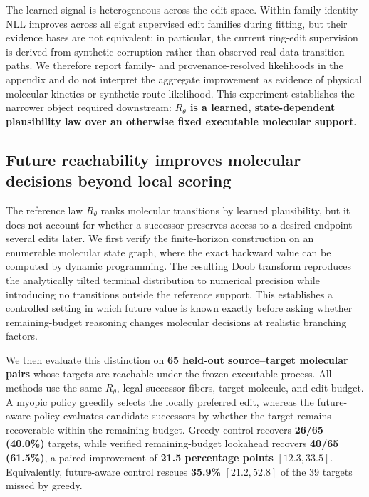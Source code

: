 The learned signal is heterogeneous across the edit space. Within-family identity NLL improves across all eight supervised edit families during fitting, but their evidence bases are not equivalent; in particular, the current ring-edit supervision is derived from synthetic corruption rather than observed real-data transition paths. We therefore report family- and provenance-resolved likelihoods in the appendix and do not interpret the aggregate improvement as evidence of physical molecular kinetics or synthetic-route likelihood. This experiment establishes the narrower object required downstream: \textbf{$R_\theta$ is a learned, state-dependent plausibility law over an otherwise fixed executable molecular support.}

\subsection{Future reachability improves molecular decisions beyond local scoring}
\label{sec:exp-lookahead}

The reference law $R_\theta$ ranks molecular transitions by learned plausibility, but it does not account for whether a successor preserves access to a desired endpoint several edits later. We first verify the finite-horizon construction on an enumerable molecular state graph, where the exact backward value can be computed by dynamic programming. The resulting Doob transform reproduces the analytically tilted terminal distribution to numerical precision while introducing no transitions outside the reference support. This establishes a controlled setting in which future value is known exactly before asking whether remaining-budget reasoning changes molecular decisions at realistic branching factors.

We then evaluate this distinction on \textbf{65 held-out source--target molecular pairs} whose targets are reachable under the frozen executable process. All methods use the same $R_\theta$, legal successor fibers, target molecule, and edit budget. A myopic policy greedily selects the locally preferred edit, whereas the future-aware policy evaluates candidate successors by whether the target remains recoverable within the remaining budget. Greedy control recovers \textbf{26/65 (40.0\%)} targets, while verified remaining-budget lookahead recovers \textbf{40/65 (61.5\%)}, a paired improvement of \textbf{21.5 percentage points} $[12.3,33.5]$. Equivalently, future-aware control rescues \textbf{35.9\%} $[21.2,52.8]$ of the 39 targets missed by greedy.

